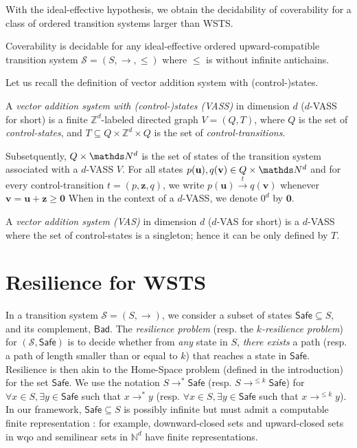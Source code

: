 \documentclass[runningheads]{llncs}
\newcommand{\Bad}{\textsf{Bad}}
\newcommand{\Safe}{\textsf{Safe}}
\begin{document}
With the ideal-effective hypothesis, we obtain the decidability of coverability for a class of ordered transition systems larger than WSTS.

\begin{theorem}\cite{BFM-ic17}
Coverability is decidable for any ideal-effective ordered upward-compatible transition system $\mathscr{S}=(S, \rightarrow, \leq)$ where $\leq$ is without infinite antichains.
\end{theorem}




Let us recall the  definition of vector addition system with (control-)states. 
 \begin{definition} 
A {\em vector addition system with (control-)states (VASS)} in dimension $d$ ($d$-VASS for short) is a finite $\mathds{Z}^d$-labeled directed graph $V = (Q,T)$, where $Q$ is the set of {\em control-states}, and $T \subseteq Q \times \mathds{Z}^d \times Q$ is the set of {\em control-transitions}. 
 \end{definition} 
%
Subsetquently, $Q \times \N^d$ is the set of states of the transition system associated with a $d$-VASS $V$.
For all states $p(\textbf{u}), q(\textbf{v}) \in Q \times \N^d$ and for every control-transition $t = (p, \textbf{z}, q)$, we write $p(\textbf{u}) \xrightarrow{t} q(\textbf{v})$ whenever $\textbf{v} = \textbf{u} + \textbf{z} \geq \textbf{0}$
%
When in the context of a $d$-VASS, we denote $0^d$ by $\textbf{0}$.

A {\em vector addition system (VAS)} in dimension $d$ ($d$-VAS for short) is a $d$-VASS where the set of control-states is a singleton; hence it can be only defined by $T$.





\section{Resilience for WSTS}



In a transition system $\mathscr{S}=(S,\rightarrow)$, we consider a subset of states $\Safe \subseteq S$, and its complement, $\Bad$.
The \emph{resilience problem} (resp. the \emph{$k$-resilience problem}) for $(\mathscr{S},\Safe)$ is to decide whether from \emph{any} state in 
$S$, \emph{there exists} a path (resp. a path of length smaller than or equal to $k$) that reaches a state in $\Safe$. Resilience is then akin to the Home-Space problem (defined in the introduction) for the set $\Safe$. We use the notation 
$S \longrightarrow^{*} \Safe$ (resp. $S \longrightarrow^{\leq k} \Safe$)
 for 
$\forall x \in S, \exists y \in \Safe$ 
 such that $x \longrightarrow^{*} y$ 
  (resp.  $\forall x \in S, \exists y \in \Safe$ such that $x \longrightarrow^{\leq k} y$).
  In our framework, $\Safe \subseteq S$  is possibly infinite but  must admit a computable finite representation : for example, downward-closed sets and upward-closed sets in wqo and semilinear sets in $\mathbb{N}^d$ have finite representations. 
\end{document}
